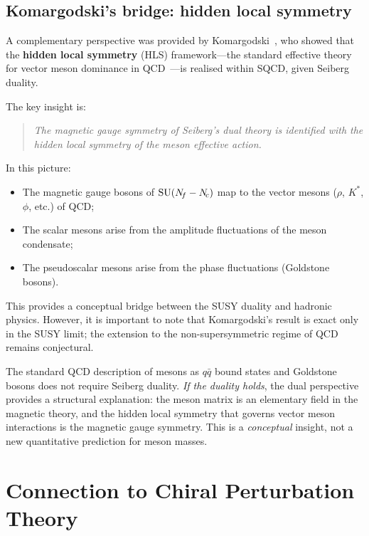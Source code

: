\documentclass[11pt,a4paper]{article}
\begin{document}
\subsection{Komargodski's bridge: hidden local symmetry}
\label{sec:komargodski}

A complementary perspective was provided by
Komargodski~\cite{Komargodski2010}, who showed that the
\textbf{hidden local symmetry} (HLS) framework---the standard
effective theory for vector meson dominance in
QCD~\cite{BandoKugoYamawaki1988}---is realised within SQCD, given
Seiberg duality.

The key insight is:
\begin{quote}
\emph{The magnetic gauge symmetry of Seiberg's dual theory is
identified with the hidden local symmetry of the meson effective
action.}
\end{quote}
In this picture:
\begin{itemize}
  \item The magnetic gauge bosons of $\mathrm{SU}(N_{\!f} - N_{\!c})$ map to the
    vector mesons ($\rho$, $K^*$, $\phi$, etc.) of QCD;
  \item The scalar mesons arise from the amplitude fluctuations of
    the meson condensate;
  \item The pseudoscalar mesons arise from the phase fluctuations
    (Goldstone bosons).
\end{itemize}
This provides a conceptual bridge between the SUSY duality and
hadronic physics.  However, it is important to note that
Komargodski's result is exact only in the SUSY limit; the extension
to the non-supersymmetric regime of QCD remains conjectural.

\begin{previewbox}[title={What the duality adds}]
The standard QCD description of mesons as $q\bar{q}$ bound states
and Goldstone bosons does not require Seiberg duality.
\emph{If the duality holds}, the dual perspective provides a
structural explanation: the meson matrix is an elementary field in
the magnetic theory, and the hidden local symmetry that governs
vector meson interactions is the magnetic gauge symmetry.  This is a
\emph{conceptual} insight, not a new quantitative prediction for
meson masses.
\end{previewbox}


\section{Connection to Chiral Perturbation Theory}
\label{sec:chpt}
\end{document}
